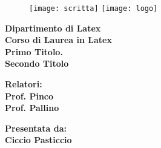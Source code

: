 \begin{titlepage}
\begin{figure}[t]
	\centering\texttt{[image: scritta]}
    \centering\texttt{[image: logo]}
\end{figure}
\begin{center}
	\textbf{ Dipartimento di Latex\\ Corso di Laurea in Latex\\}
	\vspace{15mm}
    {\LARGE{\bf Primo Titolo.}}\\
	\vspace{3mm}
	{\LARGE{\bf Secondo Titolo}}\\
\end{center}

\vspace{36mm}

\begin{minipage}[t]{0.47\textwidth}
	{\large{\bf Relatori:\\ Prof. Pinco\\ Prof. Pallino}}
\end{minipage}
\hfill
\begin{minipage}[t]{0.47\textwidth}\raggedleft
	{\large{\bf Presentata da: \\ Ciccio Pasticcio\\ }}
\end{minipage}

\vspace{18mm}


\end{titlepage}